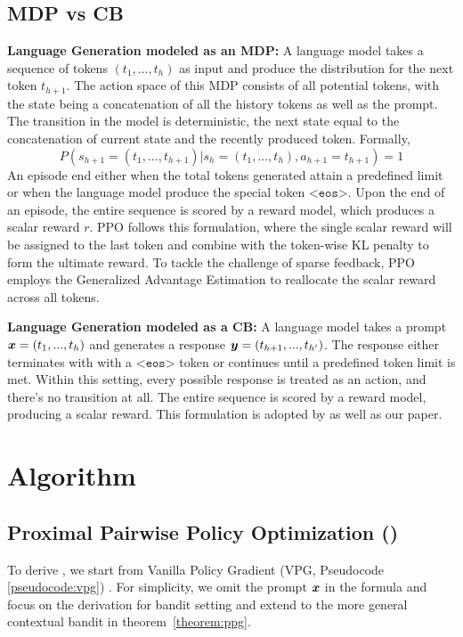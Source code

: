 \documentclass{article} %
\newcommand{\algn}{\text{P3O}}
\begin{document}
\subsection{MDP vs CB}
\textbf{Language Generation modeled as an MDP:} A language model takes a sequence of tokens $(t_1,...,t_h)$ as input and produce the distribution for the next token $t_{h+1}$. The action space of this MDP consists of all potential tokens, with the state being a concatenation of all the history tokens as well as the prompt. The transition in the model is deterministic, the next state equal to the concatenation of current state and the recently produced token. Formally,
$$P\left(s_{h+1}=(t_1,...,t_{h+1})|s_h=(t_1,...,t_h), a_{h+1}=t_{h+1}\right)=1$$
An episode end either when the total tokens generated attain a predefined limit or when the language model produce the special token $\texttt{<eos>}$. Upon the end of an episode, the entire sequence is scored by a reward model, which produces a scalar reward $r$. PPO follows this formulation, where the single scalar reward will be assigned to the last token and combine with the token-wise KL penalty to form the ultimate reward. To tackle the challenge of sparse feedback, PPO employs the Generalized Advantage Estimation \citep{schulman2015high} to reallocate the scalar reward across all tokens.

\textbf{Language Generation modeled as a CB:} A language model takes a prompt ${\bm{x}}=(t_1,...,t_h)$ and generates a response ${\bm{y}} = (t_{h+1},...,t_{h'})$. The response either terminates with with a $\texttt{<eos>}$ token or continues until a predefined token limit is met. Within this setting, every possible response is treated as an action, and there's no transition at all. The entire sequence is scored by a reward model, producing a scalar reward. This formulation is adopted by \citep{rafailov2023direct, zhu2023principled} as well as our paper. 

\section{Algorithm}
\label{sec:algorithm}
\subsection{Proximal Pairwise Policy Optimization (\algn)}
To derive \algn, we start from Vanilla Policy Gradient (VPG, Pseudocode \ref{pseudocode:vpg}) \citep{sutton1999policy,schulman2017proximal}. For simplicity, we omit the prompt ${\bm{x}}$ in the formula and focus on the derivation for bandit setting and extend to the more general contextual bandit in theorem~\ref{theorem:ppg}. 
\end{document}
